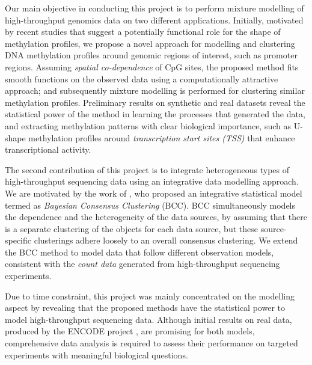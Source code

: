 Our main objective in conducting this project is to perform mixture modelling of high-throughput genomics data on two different applications. Initially, motivated by recent studies that suggest a potentially functional role for the shape of methylation profiles, we propose a novel approach for modelling and clustering DNA methylation profiles around genomic regions of interest, such as promoter regions. Assuming \emph{spatial co-dependence} of CpG sites, the proposed method fits smooth functions on the observed data using a computationally attractive approach; and subsequently mixture modelling is performed for clustering similar methylation profiles. Preliminary results on synthetic and real datasets reveal the statistical power of the method in learning the processes that generated the data, and extracting methylation patterns with clear biological importance, such as U-shape methylation profiles around \emph{transcription start sites (TSS)} that enhance transcriptional activity.

The second contribution of this project is to integrate heterogeneous types of high-throughput sequencing data using an integrative data modelling approach. We are motivated by the work of \citet{Lock2013}, who proposed an integrative statistical model termed as \emph{Bayesian Consensus Clustering} (BCC). BCC simultaneously models the dependence and the heterogeneity of the data sources, by assuming that there is a separate clustering of the objects for each data source, but these source-specific clusterings adhere loosely to an overall consensus clustering. We extend the BCC method to model data that follow different observation models, consistent with the \emph{count data} generated from high-throughput sequencing experiments.

Due to time constraint, this project was mainly concentrated on the modelling aspect by revealing that the proposed methods have the statistical power to model high-throughput sequencing data. Although initial results on real data, produced by the ENCODE project \citet{Dunham2012}, are promising for both models, comprehensive data analysis is required to assess their performance on targeted experiments with meaningful biological questions. 


